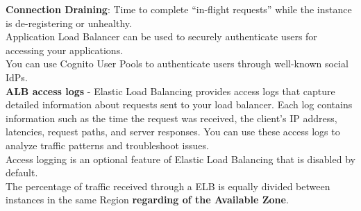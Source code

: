 \documentclass[12pt, letterpaper, twoside]{article}
\begin{document}
\textbf{Connection Draining}:  Time to complete “in-flight requests” while the instance is de-registering or unhealthy.\\

Application Load Balancer can be used to securely authenticate users for accessing your applications.\\
You can use Cognito User Pools to authenticate users through well-known social IdPs.\\

\textbf{ALB access logs} - Elastic Load Balancing provides access logs that capture detailed information about 
requests sent to your load balancer. Each log contains information such as the time the request was received, 
the client's IP address, latencies, request paths, and server responses. You can use these access logs to analyze 
traffic patterns and troubleshoot issues.\\
Access logging is an optional feature of Elastic Load Balancing that is disabled by default.\\

The percentage of traffic received through a ELB is equally divided between instances in the same Region 
\textbf{regarding of the Available Zone}.

\printindex
\end{document}
